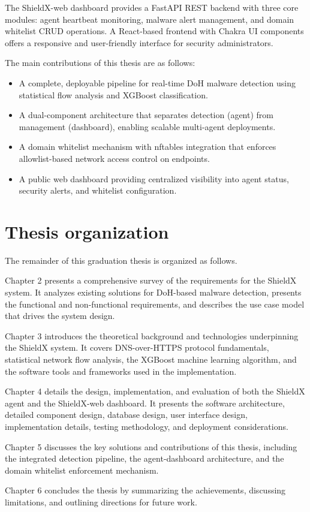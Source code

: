 \documentclass[../Main.tex]{subfiles}
\begin{document}
The ShieldX-web dashboard provides a FastAPI REST backend with three core modules: agent heartbeat monitoring, malware alert management, and domain whitelist CRUD operations. A React-based frontend with Chakra UI components offers a responsive and user-friendly interface for security administrators.

The main contributions of this thesis are as follows:
\begin{itemize}
    \item A complete, deployable pipeline for real-time DoH malware detection using statistical flow analysis and XGBoost classification.
    \item A dual-component architecture that separates detection (agent) from management (dashboard), enabling scalable multi-agent deployments.
    \item A domain whitelist mechanism with nftables integration that enforces allowlist-based network access control on endpoints.
    \item A public web dashboard providing centralized visibility into agent status, security alerts, and whitelist configuration.
\end{itemize}

\section{Thesis organization}
\label{section:1.4}

The remainder of this graduation thesis is organized as follows.

Chapter 2 presents a comprehensive survey of the requirements for the ShieldX system. It analyzes existing solutions for DoH-based malware detection, presents the functional and non-functional requirements, and describes the use case model that drives the system design.

Chapter 3 introduces the theoretical background and technologies underpinning the ShieldX system. It covers DNS-over-HTTPS protocol fundamentals, statistical network flow analysis, the XGBoost machine learning algorithm, and the software tools and frameworks used in the implementation.

Chapter 4 details the design, implementation, and evaluation of both the ShieldX agent and the ShieldX-web dashboard. It presents the software architecture, detailed component design, database design, user interface design, implementation details, testing methodology, and deployment considerations.

Chapter 5 discusses the key solutions and contributions of this thesis, including the integrated detection pipeline, the agent-dashboard architecture, and the domain whitelist enforcement mechanism.

Chapter 6 concludes the thesis by summarizing the achievements, discussing limitations, and outlining directions for future work.
\end{document}
